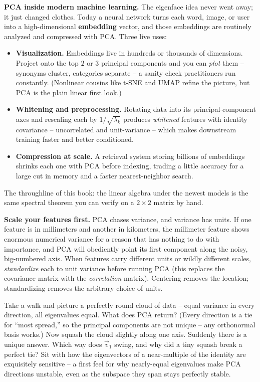 \begin{applicationbox}
\textbf{PCA inside modern machine learning.} The eigenface idea never went away; it
just changed clothes. Today a neural network turns each word, image, or user into a
high-dimensional \textbf{embedding} vector, and those embeddings are routinely
analyzed and compressed with PCA. Three live uses:
\begin{itemize}
  \item \textbf{Visualization.} Embeddings live in hundreds or thousands of
        dimensions. Project onto the top $2$ or $3$ principal components and you can
        \emph{plot} them -- synonyms cluster, categories separate -- a sanity check
        practitioners run constantly. (Nonlinear cousins like t-SNE and UMAP refine
        the picture, but PCA is the plain linear first look.)
  \item \textbf{Whitening and preprocessing.} Rotating data into its
        principal-component axes and rescaling each by $1/\sqrt{\lambda_k}$
        produces \emph{whitened} features with identity covariance -- uncorrelated
        and unit-variance -- which makes downstream training faster and better
        conditioned.
  \item \textbf{Compression at scale.} A retrieval system storing billions of
        embeddings shrinks each one with PCA before indexing, trading a little
        accuracy for a large cut in memory and a faster nearest-neighbor search.
\end{itemize}
The throughline of this book: the linear algebra under the newest models is the
same spectral theorem you can verify on a $2\times2$ matrix by hand.
\end{applicationbox}

\begin{trapbox}
\textbf{Scale your features first.} PCA chases variance, and variance has units. If
one feature is in millimeters and another in kilometers, the millimeter feature
shows enormous numerical variance for a reason that has nothing to do with
importance, and PCA will obediently point its first component along the noisy,
big-numbered axis. When features carry different units or wildly different scales,
\emph{standardize} each to unit variance before running PCA (this replaces the
covariance matrix with the \emph{correlation} matrix). Centering removes the
location; standardizing removes the arbitrary choice of units.
\end{trapbox}

\begin{walkbox}
Take a walk and picture a perfectly round cloud of data -- equal variance in every
direction, all eigenvalues equal. What does PCA return? (Every direction is a tie
for ``most spread,'' so the principal components are not unique -- any orthonormal
basis works.) Now squash the cloud slightly along one axis. Suddenly there is a
unique answer. Which way does $\vec v_1$ swing, and why did a tiny squash break a
perfect tie? Sit with how the eigenvectors of a near-multiple of the identity are
exquisitely sensitive -- a first feel for why nearly-equal eigenvalues make PCA
directions unstable, even as the subspace they span stays perfectly stable.
\end{walkbox}

